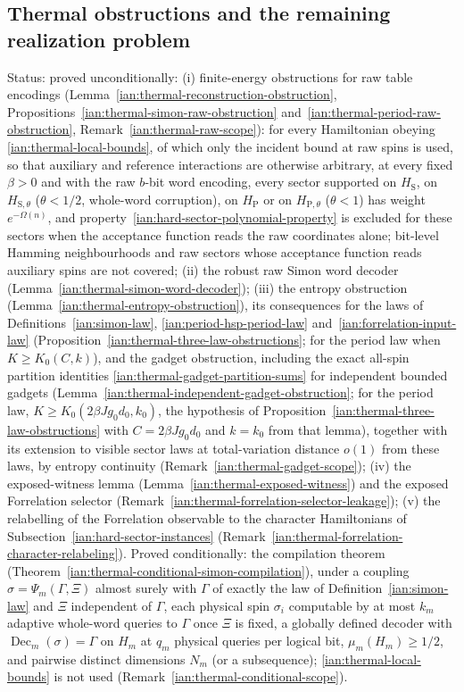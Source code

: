 \subsection{Thermal obstructions and the remaining realization problem}\label{ian:thermal-realization}
Status: proved unconditionally: (i) finite-energy obstructions for raw table encodings (Lemma~\ref{ian:thermal-reconstruction-obstruction}, Propositions~\ref{ian:thermal-simon-raw-obstruction} and~\ref{ian:thermal-period-raw-obstruction}, Remark~\ref{ian:thermal-raw-scope}): for every Hamiltonian obeying \eqref{ian:thermal-local-bounds}, of which only the incident bound at raw spins is used, so that auxiliary and reference interactions are otherwise arbitrary, at every fixed \(\beta>0\) and with the raw \(b\)-bit word encoding, every sector supported on \(H_{\mathrm S}\), on \(H_{\mathrm S,\theta}\) (\(\theta<1/2\), whole-word corruption), on \(H_{\mathrm P}\) or on \(H_{\mathrm P,\theta}\) (\(\theta<1\)) has weight \(e^{-\Omega(n)}\), and property~\eqref{ian:hard-sector-polynomial-property} is excluded for these sectors when the acceptance function reads the raw coordinates alone; bit-level Hamming neighbourhoods and raw sectors whose acceptance function reads auxiliary spins are not covered; (ii) the robust raw Simon word decoder (Lemma~\ref{ian:thermal-simon-word-decoder}); (iii) the entropy obstruction (Lemma~\ref{ian:thermal-entropy-obstruction}), its consequences for the laws of Definitions~\ref{ian:simon-law}, \ref{ian:period-hsp-period-law} and~\ref{ian:forrelation-input-law} (Proposition~\ref{ian:thermal-three-law-obstructions}; for the period law when \(K\ge K_0(C,k)\)), and the gadget obstruction, including the exact all-spin partition identities \eqref{ian:thermal-gadget-partition-sums} for independent bounded gadgets (Lemma~\ref{ian:thermal-independent-gadget-obstruction}; for the period law, \(K\ge K_0(2\beta Jg_0d_0,k_0)\), the hypothesis of Proposition~\ref{ian:thermal-three-law-obstructions} with \(C=2\beta Jg_0d_0\) and \(k=k_0\) from that lemma), together with its extension to visible sector laws at total-variation distance \(o(1)\) from these laws, by entropy continuity (Remark~\ref{ian:thermal-gadget-scope}); (iv) the exposed-witness lemma (Lemma~\ref{ian:thermal-exposed-witness}) and the exposed Forrelation selector (Remark~\ref{ian:thermal-forrelation-selector-leakage}); (v) the relabelling of the Forrelation observable to the character Hamiltonians of Subsection~\ref{ian:hard-sector-instances} (Remark~\ref{ian:thermal-forrelation-character-relabeling}). Proved conditionally: the compilation theorem (Theorem~\ref{ian:thermal-conditional-simon-compilation}), under a coupling \(\sigma=\Psi_m(\Gamma,\Xi)\) almost surely with \(\Gamma\) of exactly the law of Definition~\ref{ian:simon-law} and \(\Xi\) independent of \(\Gamma\), each physical spin \(\sigma_i\) computable by at most \(k_m\) adaptive whole-word queries to \(\Gamma\) once \(\Xi\) is fixed, a globally defined decoder with \(\operatorname{Dec}_m(\sigma)=\Gamma\) on \(H_m\) at \(q_m\) physical queries per logical bit, \(\mu_m(H_m)\ge1/2\), and pairwise distinct dimensions \(N_m\) (or a subsequence); \eqref{ian:thermal-local-bounds} is not used (Remark~\ref{ian:thermal-conditional-scope}). 